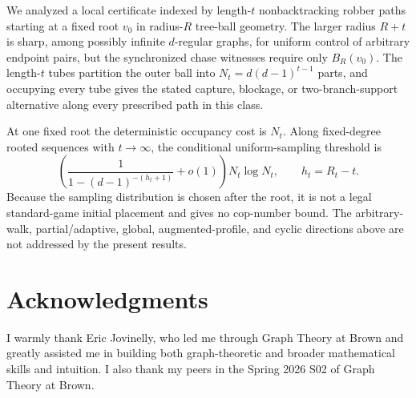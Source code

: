 \documentclass[11pt]{amsart}
\theoremstyle{definition}
\begin{document}
We analyzed a local certificate indexed by length-$t$ nonbacktracking robber paths starting at a fixed root $v_0$ in radius-$R$ tree-ball geometry. The larger radius $R+t$ is sharp, among possibly infinite $d$-regular graphs, for uniform control of arbitrary endpoint pairs, but the synchronized chase witnesses require only $B_R(v_0)$. The length-$t$ tubes partition the outer ball into $N_t=d(d-1)^{t-1}$ parts, and occupying every tube gives the stated capture, blockage, or two-branch-support alternative along every prescribed path in this class.

At one fixed root the deterministic occupancy cost is $N_t$. Along fixed-degree rooted sequences with $t\to\infty$, the conditional uniform-sampling threshold is
\[
\left(\frac{1}{1-(d-1)^{-(h_t+1)}}+o(1)\right)N_t\log N_t,
\qquad h_t=R_t-t.
\]
Because the sampling distribution is chosen after the root, it is not a legal standard-game initial placement and gives no cop-number bound. The arbitrary-walk, partial/adaptive, global, augmented-profile, and cyclic directions above are not addressed by the present results.

\section*{Acknowledgments}
I warmly thank Eric Jovinelly, who led me through Graph Theory at Brown and greatly assisted me in building both graph-theoretic and broader mathematical skills and intuition. I also thank my peers in the Spring 2026 S02 of Graph Theory at Brown.
\end{document}
